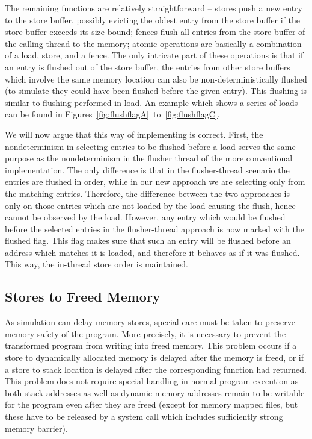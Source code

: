 The remaining functions are relatively straightforward -- stores push a new
entry to the store buffer, possibly evicting the oldest entry from the store
buffer if the store buffer exceeds its size bound; fences flush all entries from the
store buffer of the calling thread to the memory; atomic operations are basically a
combination of a load, store, and a fence.
The only intricate part of these operations is that if an entry is flushed out
of the store buffer, the entries from other store buffers which involve the same memory location can also be non-deterministically flushed (to simulate they could have been flushed before the given entry).
This flushing is similar to flushing performed in load.
An example which shows a series of loads can be found in Figures~\ref{fig:flushflagA}~to~\ref{fig:flushflagC}.


We will now argue that this way of implementing \xtso is correct.
First, the nondeterminism in selecting entries to be flushed before a load serves the same purpose as the nondeterminism in the flusher thread of the more conventional implementation.
The only difference is that in the flusher-thread scenario the entries are
flushed in order, while in our new approach we are selecting only from the matching entries.
Therefore, the difference between the two approaches is only on those entries
which are not loaded by the load causing the flush, hence cannot be observed by the load.
However, any entry which would be flushed before the selected entries in the flusher-thread approach is now marked with the flushed flag.
This flag makes sure that such an entry will be flushed before an address which matches it is loaded, and therefore it behaves as if it was flushed.
This way, the in-thread store order is maintained.

\subsection{Stores to Freed Memory}

As \xtso simulation can delay memory stores, special care must be taken to preserve memory safety of the program.
More precisely, it is necessary to prevent the transformed program from writing into freed memory.
This problem occurs if a store to dynamically allocated memory is delayed after the memory is freed, or if a store to stack location is delayed after the corresponding function had returned.
This problem does not require special handling in normal program execution as both stack addresses as well as dynamic memory addresses remain to be writable for the program even after they are freed (except for memory mapped files, but these have to be released by a system call which includes sufficiently strong memory barrier).


